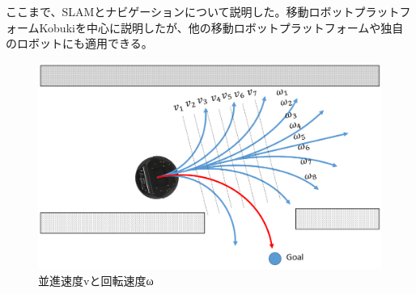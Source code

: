 ここまで、SLAMとナビゲーションについて説明した。移動ロボットプラットフォームKobukiを中心に説明したが、他の移動ロボットプラットフォームや独自のロボットにも適用できる。

\begin{figure}[htp]
  \centering
  \includegraphics[width=\columnwidth]{pictures/chapter10/pic_10_22.png}
  \caption{並進速度vと回転速度ω}
\end{figure}



